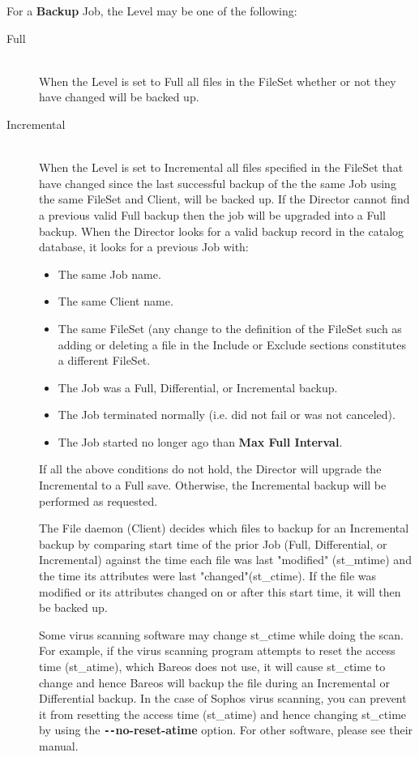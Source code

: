 \begin{description}
For a {\bf Backup} Job, the Level may be one of the  following:

\begin{description}

\item [Full] \hfill \\
When the Level is set to Full all files in the FileSet whether or not
they have changed will be backed up.

\item [Incremental] \hfill \\
When the Level is set to Incremental all files specified in the FileSet
that have changed since the last successful backup of the the same Job
using the same FileSet and Client, will be backed up.  If the Director
cannot find a previous valid Full backup then the job will be upgraded
into a Full backup.  When the Director looks for a valid backup record
in the catalog database, it looks for a previous Job with:

\begin{itemize}
\item The same Job name.
\item The same Client name.
\item The same FileSet (any change to the definition of  the FileSet such as
adding or deleting a file in the  Include or Exclude sections constitutes a
different FileSet.
\item The Job was a Full, Differential, or Incremental backup.
\item The Job terminated normally (i.e. did not fail or was not  canceled).
\item The Job started no longer ago than {\bf Max Full Interval}.
\end{itemize}

If all the above conditions do not hold, the Director will upgrade  the
Incremental to a Full save. Otherwise, the Incremental  backup will be
performed as requested.

The File daemon (Client) decides which files to backup for an
Incremental backup by comparing start time of the prior Job (Full,
Differential, or Incremental) against the time each file was last
"modified" (st\_mtime) and the time its attributes were last
"changed"(st\_ctime).  If the file was modified or its attributes
changed on or after this start time, it will then be backed up.

Some virus scanning software may change st\_ctime while
doing the scan.  For example, if the virus scanning program attempts to
reset the access time (st\_atime), which Bareos does not use, it will
cause st\_ctime to change and hence Bareos will backup the file during
an Incremental or Differential backup.  In the case of Sophos virus
scanning, you can prevent it from resetting the access time (st\_atime)
and hence changing st\_ctime by using the {\bf \verb:--:no-reset-atime}
option.  For other software, please see their manual.


\end{description}
\end{description}
